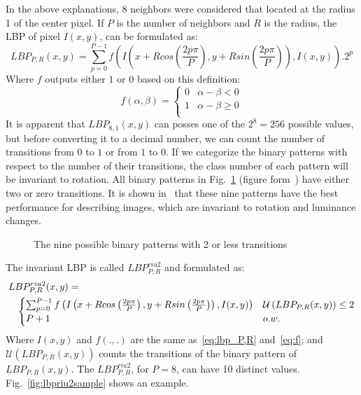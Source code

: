 In the above explanations, 8 neighbors were considered that located at the radius 1 of the center pixel. If $P$ is the number of neighbors and $R$ is the radius, the LBP of pixel $I(x, y)$, can be formulated as:
\begin{equation}
    LBP_{P,R}(x, y) = \sum_{p=0}^{P-1}f\left(I\left(x+R cos\left(\frac{2 p  \pi}{P}\right),y+R sin\left(\frac{2 p  \pi}{P}\right)\right), I(x, y)\right).2^p
    \label{eq:lbp_P,R}
\end{equation}
Where $f$ outputs either $1$ or $0$ based on this definition:
\begin{equation}
    f(\alpha, \beta) = 
    \begin{cases}
        0 & \alpha-\beta < 0\\
        1 & \alpha-\beta \geq 0\\
    \end{cases}
\label{eq:f}
\end{equation}
It is apparent that $LBP_{8, 1}(x, y)$ can posses one of the $2^8=256$ possible values, but before converting it to a decimal number, we can count the number of transitions from $0$ to $1$ or from $1$ to $0$. If we categorize the binary patterns with respect to the number of their transitions, the class number of each pattern will be invariant to rotation. All binary patterns in Fig.~\ref{fig:roi} (figure form~\cite{Ojala2002}) have either two or zero transitions. It is shown in~\cite{Ojala2002} that these nine patterns have the best performance for describing images, which are invariant to rotation and luminance changes.
\begin{figure}
    \centering
    \caption{The nine possible binary patterns with 2 or less transitions}
    \label{fig:roi}
\end{figure}
The invariant LBP is called $LBP_{P, R}^{riu2}$ and formulated as:
\begin{equation}
    \begin{aligned}
        \lefteqn{LBP_{P, R}^{riu2}(x, y) =  }\\
        & & \begin{cases}
            \sum_{p=0}^{P-1}f\left( I\left(x+R cos\left(\frac{2 p  \pi}{P}\right),y+R sin\left(\frac{2 p  \pi}{P}\right)\right), I(x, y)\right) & \mathcal{U}\left(LBP_{P, R}(x, y)\right)\leq 2\\
            P+1 & o.w.
        \end{cases}
    \end{aligned}
    \label{eq:riu2}
\end{equation}
Where $I(x, y)$ and $f(., .)$ are the same as~\ref{eq:lbp_P,R} and~\ref{eq:f}; and $\mathcal{U}\left(LBP_{P, R}(x, y)\right)$ counts the transitions of the binary pattern of $LBP_{P, R}(x, y)$. The $LBP_{P, R}^{riu2}$, for $P=8$, can have 10 distinct values. Fig.~\ref{fig:lbpriu2sample} shows an example. 

